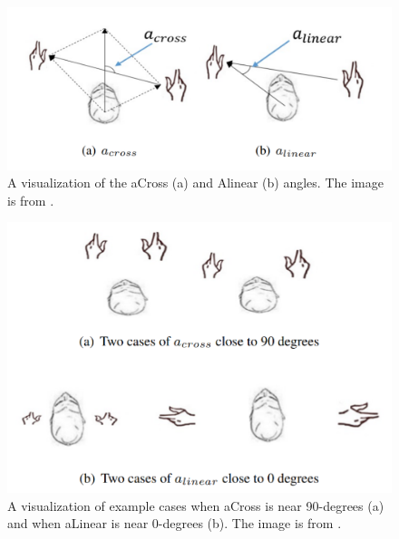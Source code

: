 \documentclass{vgtc}                          %
\begin{document}
\begin{figure}[tb]
 \centering %
 \includegraphics[width=\columnwidth]{pictures/Figure aCross,aLinear.png}
 \caption{A visualization of the aCross (a) and Alinear (b) angles. The image is from \cite{Real-Time}.}
 \label{fig:aCrossALinearAng}
\end{figure}
\begin{figure}[tb]
 \centering %
 \includegraphics[width=\columnwidth]{pictures/Figure aCross,aLinear valid.png}
 \caption{A visualization of example cases when aCross is near 90-degrees (a) and when aLinear is near 0-degrees (b). The image is from \cite{Real-Time}.}
 \label{fig:aCrossALinearEx}
\end{figure}
\end{document}
